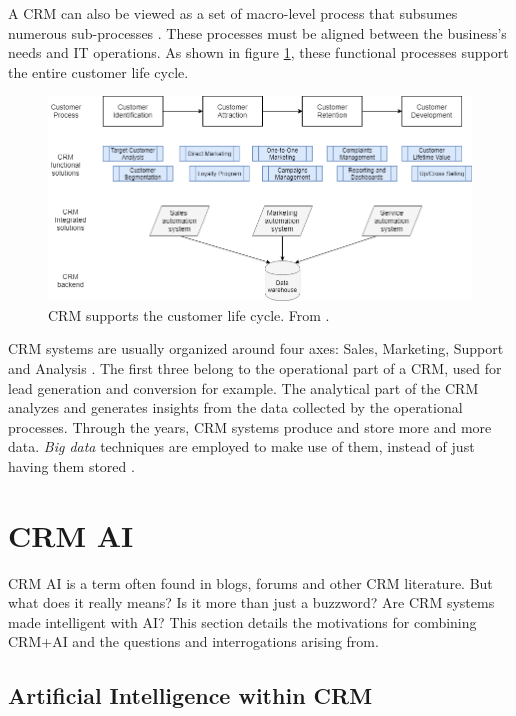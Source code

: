 A CRM can also be viewed as a set of macro-level process that subsumes numerous sub-processes \cite{crm-processes}. These processes must be aligned between the business's needs and IT operations. As shown in figure \ref{fig:crm-clc}, these functional processes support the entire customer life cycle.

\begin{figure}[h]
    \centering
    \includegraphics[width=14cm]{images/CRM-CustomerLifeCycle.png}
    \caption[CRM supports the customer life cycle]{CRM supports the customer life cycle. From \cite{DataAnalyticsinCRMProcessesALiteratureReview}.}
    \label{fig:crm-clc}
\end{figure}

CRM systems are usually organized around four axes: Sales, Marketing, Support and Analysis \cite{crm-def}. The first three belong to the operational part of a CRM, used for lead generation and conversion for example. The analytical part of the CRM analyzes and generates insights from the data collected by the operational processes. Through the years, CRM systems produce and store more and more data. \textit{Big data} techniques are employed to make use of them, instead of just having them stored \cite{peel-et-al}.


\section{CRM AI}

CRM AI is a term often found in blogs, forums and other CRM literature. But what does it really means? Is it more than just a buzzword? Are CRM systems made intelligent with AI? This section details the motivations for combining CRM+AI and the questions and interrogations arising from.

\subsection{Artificial Intelligence within CRM}

